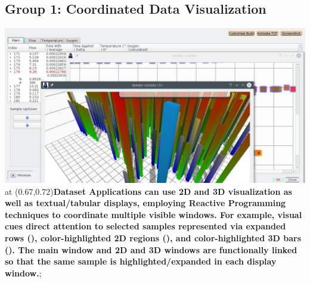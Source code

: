 \atsptt
\begin{frame}{}
\section{Group 1: Coordinated Data Visualization}

	\pdfpageheight 30cm
	
\begin{annotatedFigure}{2mm}{-1mm}{\includegraphics[scale=1]{texs/coord.png}}
  \node [anchor=west,inner sep=14, text width=8.7cm,
  line width=1mm, fill opacity=0.9,
  draw = blue!20!black,
  top color=white,text=black,
  bottom color=blue!40,
  rounded corners=6pt
  ]
  at (0.67,0.72){\annfont\textbf{Dataset Applications can use 2D and 3D 
  		visualization as well as textual/tabular displays, employing Reactive 
  		Programming techniques to coordinate multiple visible windows.  For example, 
  		visual cues direct attention to selected samples represented via 
  		expanded rows (), color-highlighted 2D regions (), 
  		and color-highlighted 3D bars ().  The main window and 2D and 3D windows are functionally linked so that the same sample is 
  		highlighted/expanded in each display window.}};
  
              
\end{annotatedFigure}	
\end{frame}

